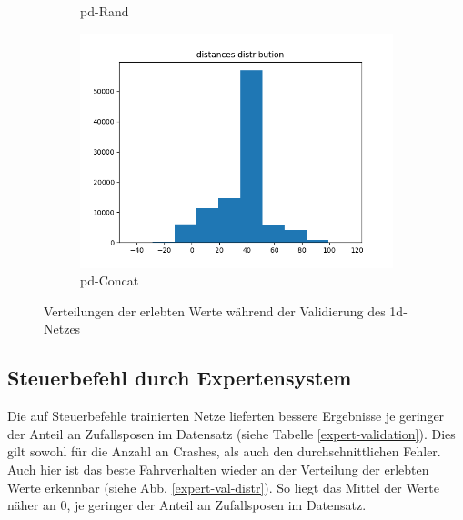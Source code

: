\begin{figure}[H]
\begin{subfigure}[h]{0.3\textwidth}
		\caption{\glqq\acs{pd}-Rand\grqq}
		\label{1d-pd-rand-val-distr}
	\end{subfigure}
	\begin{subfigure}[h]{0.3\textwidth}
		\centering
		\includegraphics[width=\linewidth]{kapitel5/images/eval/d-only/pd-concat-distr.png}
		\caption{\glqq\acs{pd}-Concat\grqq}
		\label{1d-pd-concat-val-distr}
	\end{subfigure}
	\caption{Verteilungen der erlebten Werte während der Validierung des \acs{1d}-Netzes}
	\label{1d-val-distr}
\end{figure}

\subsection{Steuerbefehl durch Expertensystem}

Die auf Steuerbefehle trainierten Netze lieferten bessere Ergebnisse je geringer der Anteil an Zufallsposen im Datensatz (siehe Tabelle \ref{expert-validation}). Dies gilt sowohl für die Anzahl an Crashes, als auch den durchschnittlichen Fehler.
Auch hier ist das beste Fahrverhalten wieder an der Verteilung der erlebten Werte erkennbar (siehe Abb. \ref{expert-val-distr}). So liegt das Mittel der Werte näher an 0, je geringer der Anteil an Zufallsposen im Datensatz.

